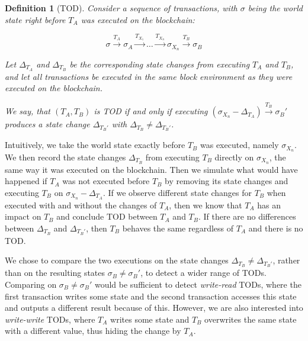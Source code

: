 \documentclass[draft,final]{vutinfth} %
\newtheorem{definition}{Definition}
\begin{document}
\begin{definition}[TOD]
    Consider a sequence of transactions, with $\sigma$ being the world state right before $T_A$ was executed on the blockchain:

    $$\sigma \xrightarrow{T_A} \sigma_A \xrightarrow{T_{X_1}} \dots \xrightarrow{T_{X_n}} \sigma_{X_n} \xrightarrow{T_B} \sigma_B$$

    Let $\Delta_{T_A}$ and $\Delta_{T_B}$ be the corresponding state changes from executing $T_A$ and $T_B$, and let all transactions be executed in the same block environment as they were executed on the blockchain.

    We say, that $(T_A, T_B)$ is TOD if and only if executing $(\sigma_{X_n} - \Delta_{T_A}) \xrightarrow{T_B} \sigma_B\prime$ produces a state change $\Delta_{T_B\prime}$ with $\Delta_{T_B} \neq \Delta_{T_B\prime}$.
\end{definition}

Intuitively, we take the world state exactly before $T_B$ was executed, namely $\sigma_{X_n}$. We then record the state changes $\Delta_{T_B}$ from executing $T_B$ directly on $\sigma_{X_n}$, the same way it was executed on the blockchain. Then we simulate what would have happened if $T_A$ was not executed before $T_B$ by removing its state changes and executing $T_B$ on $\sigma_{X_n} - \Delta_{T_A}$. If we observe different state changes for $T_B$ when executed with and without the changes of $T_A$, then we know that $T_A$ has an impact on $T_B$ and conclude TOD between $T_A$ and $T_B$. If there are no differences between $\Delta_{T_B}$ and $\Delta_{T_B\prime}$, then $T_B$ behaves the same regardless of $T_A$ and there is no TOD.

We chose to compare the two executions on the state changes $\Delta_{T_B} \neq \Delta_{T_B\prime}$, rather than on the resulting states $\sigma_B \neq \sigma_B\prime$, to detect a wider range of TODs. Comparing on $\sigma_B \neq \sigma_B\prime$ would be sufficient to detect \emph{write-read} TODs, where the first transaction writes some state and the second transaction accesses this state and outputs a different result because of this. However, we are also interested into \emph{write-write} TODs, where $T_A$ writes some state and $T_B$ overwrites the same state with a different value, thus hiding the change by $T_A$.
\end{document}
